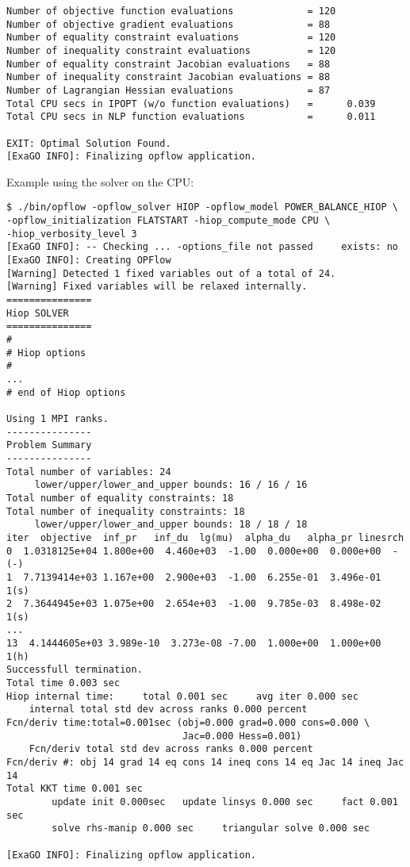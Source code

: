 \begin{lstlisting}
Number of objective function evaluations             = 120
Number of objective gradient evaluations             = 88
Number of equality constraint evaluations            = 120
Number of inequality constraint evaluations          = 120
Number of equality constraint Jacobian evaluations   = 88
Number of inequality constraint Jacobian evaluations = 88
Number of Lagrangian Hessian evaluations             = 87
Total CPU secs in IPOPT (w/o function evaluations)   =      0.039
Total CPU secs in NLP function evaluations           =      0.011

EXIT: Optimal Solution Found.
[ExaGO INFO]: Finalizing opflow application.
\end{lstlisting}

Example using the \hiop solver on the CPU:

\begin{lstlisting}
$ ./bin/opflow -opflow_solver HIOP -opflow_model POWER_BALANCE_HIOP \
-opflow_initialization FLATSTART -hiop_compute_mode CPU \
-hiop_verbosity_level 3
[ExaGO INFO]: -- Checking ... -options_file not passed     exists: no
[ExaGO INFO]: Creating OPFlow
[Warning] Detected 1 fixed variables out of a total of 24.
[Warning] Fixed variables will be relaxed internally.
===============
Hiop SOLVER
===============
#
# Hiop options
#
...
# end of Hiop options

Using 1 MPI ranks.
---------------
Problem Summary
---------------
Total number of variables: 24
     lower/upper/lower_and_upper bounds: 16 / 16 / 16
Total number of equality constraints: 18
Total number of inequality constraints: 18
     lower/upper/lower_and_upper bounds: 18 / 18 / 18
iter  objective  inf_pr   inf_du  lg(mu)  alpha_du   alpha_pr linesrch
0  1.0318125e+04 1.800e+00  4.460e+03  -1.00  0.000e+00  0.000e+00  -(-)
1  7.7139414e+03 1.167e+00  2.900e+03  -1.00  6.255e-01  3.496e-01  1(s)
2  7.3644945e+03 1.075e+00  2.654e+03  -1.00  9.785e-03  8.498e-02  1(s)
...
13  4.1444605e+03 3.989e-10  3.273e-08 -7.00  1.000e+00  1.000e+00  1(h)
Successfull termination.
Total time 0.003 sec
Hiop internal time:     total 0.001 sec     avg iter 0.000 sec
    internal total std dev across ranks 0.000 percent
Fcn/deriv time:total=0.001sec (obj=0.000 grad=0.000 cons=0.000 \
                               Jac=0.000 Hess=0.001)
    Fcn/deriv total std dev across ranks 0.000 percent
Fcn/deriv #: obj 14 grad 14 eq cons 14 ineq cons 14 eq Jac 14 ineq Jac 14
Total KKT time 0.001 sec
        update init 0.000sec   update linsys 0.000 sec     fact 0.001 sec
        solve rhs-manip 0.000 sec     triangular solve 0.000 sec

[ExaGO INFO]: Finalizing opflow application.
\end{lstlisting}

